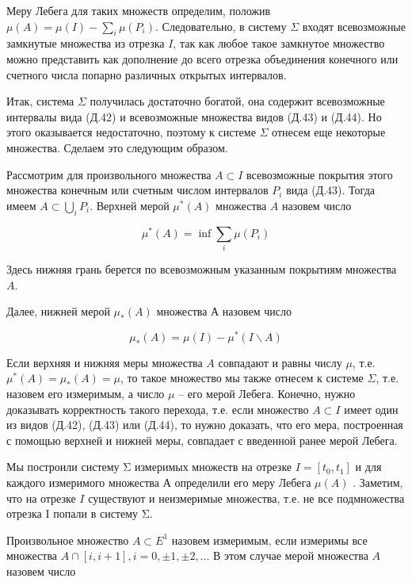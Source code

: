 \documentclass[8pt]{extarticle}
\begin{document}
Меру Лебега для таких множеств определим, положив \(\mu \left( A\right)  = \mu \left( I\right)  - \mathop{\sum }\limits_{i}\mu \left( {P}_{i}\right)\). Следовательно, в систему \(\Sigma\) входят всевозможные замкнутые множества из отрезка \(I\), так как любое такое замкнутое множество можно представить как дополнение до всего отрезка объединения конечного или счетного числа попарно различных открытых интервалов.

Итак, система \(\Sigma\) получилась достаточно богатой, она содержит всевозможные интервалы вида (Д.42) и всевозможные множества видов (Д.43) и (Д.44). Но этого оказывается недостаточно, поэтому к системе \(\Sigma\) отнесем еще некоторые множества. Сделаем это следующим образом.

Рассмотрим для произвольного множества \(A \subset  I\) всевозможные покрытия этого множества конечным или счетным числом интервалов \({P}_{i}\) вида (Д.43). Тогда имеем \(A \subset  \mathop{\bigcup }\limits_{i}{P}_{i}\). Верхней мерой \({\mu }^{ * }\left( A\right)\) множества \(A\) назовем число

\[
{\mu }^{ * }\left( A\right)  = \inf \mathop{\sum }\limits_{i}\mu \left( {P}_{i}\right)
\]

Здесь нижняя грань берется по всевозможным указанным покрытиям множества \(A\).

Далее, нижней мерой \({\mu }_{ * }\left( A\right)\) множества А назовем число

\[
{\mu }_{ * }\left( A\right)  = \mu \left( I\right)  - {\mu }^{ * }\left( {I \smallsetminus  A}\right)
\]

Если верхняя и нижняя меры множества \(A\) совпадают и равны числу \(\mu\), т.е. \({\mu }^{ * }\left( A\right)  = {\mu }_{ * }\left( A\right)  = \mu\), то такое множество мы также отнесем к системе \(\Sigma\), т.е. назовем его измеримым, а число \(\mu\) -- его мерой Лебега. Конечно, нужно доказывать корректность такого перехода, т.е. если множество \(A \subset  I\) имеет один из видов (Д.42), (Д.43) или (Д.44), то нужно доказать, что его мера, построенная с помощью верхней и нижней меры, совпадает с введенной ранее мерой Лебега.

Мы построили систему Σ измеримых множеств на отрезке \(I = \left\lbrack  {{t}_{0},{t}_{1}}\right\rbrack\) и для каждого измеримого множества А определили его меру Лебега \(\mu \left( A\right)\) . Заметим, что на отрезке \(I\) существуют и неизмеримые множества, т.е. не все подмножества отрезка I попали в систему Σ.

Произвольное множество \(A \subset  {E}^{1}\) назовем измеримым, если измеримы все множества \(A \cap  \left\lbrack  {i,i + 1}\right\rbrack  ,i = 0, \pm  1, \pm  2,\ldots\) В этом случае мерой множества \(A\) назовем число
\end{document}
